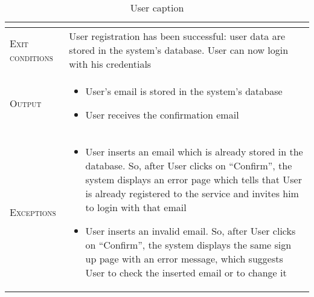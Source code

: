 \begin{table}[H]
\begin{tabular}[c]{|l|p{}|}
\begin{itemize}
                                        \end{itemize}\\
        \hline %
        \textsc{Exit conditions}    &  User registration has been successful: user data are stored in the system’s database. User can now login with his credentials\\
    	\hline %
    	\textsc{Output}             &  \begin{itemize}
    	    \item User’s email is stored in the system’s database
            \item User receives the confirmation email

    	\end{itemize}\\
    	\hline %
    	\textsc{Exceptions}         &  \begin{itemize}
    	    \item User inserts an email which is already stored in the database. So, after User clicks on “Confirm”, the system displays an error page which tells that User is already registered to the service and invites him to login with that email
            \item User inserts an invalid email. So, after User clicks on “Confirm”, the system displays the same sign up page with an error message, which suggests User to check the inserted email or to change it

    	\end{itemize}\\
    	\hline %
        
    \end{tabular}
    \caption{\label{tab:user_sign_up}User caption }
\end{table}


